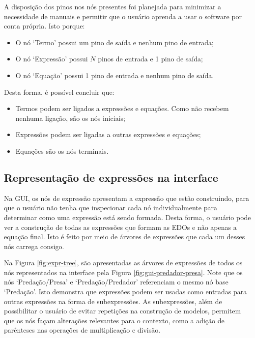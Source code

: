 \documentclass[
	12pt,				%
	openright,			%
	oneside,			%
	a4paper,			%
	main=brazil,
	english,			%
	]{ufsj-abntex2}
\begin{document}
A disposição dos pinos nos nós presentes foi planejada para minimizar a necessidade de manuais e permitir que o usuário aprenda a usar o software por conta própria. Isto porque:

\begin{itemize}
    \item O nó `Termo' possui um pino de saída e nenhum pino de entrada;
    \item O nó `Expressão' possui $N$ pinos de entrada e 1 pino de saída;
    \item O nó `Equação' possui 1 pino de entrada e nenhum pino de saída.
\end{itemize}

Desta forma, é possível concluir que:

\begin{itemize}
    \item Termos podem ser ligados a expressões e equações. Como não recebem nenhuma ligação, são os nós iniciais;
    \item Expressões podem ser ligadas a outras expressões e equações;
    \item Equações são os nós terminais.
\end{itemize}

\subsection{Representação de expressões na interface}
\label{subsec:exprtree}

Na GUI, os nós de expressão apresentam a expressão que estão construindo, para que o usuário não tenha que inspecionar cada nó individualmente para determinar como uma expressão está sendo formada. Desta forma, o usuário pode ver a construção de todas as expressões que formam as EDOs e não apenas a equação final. Isto é feito por meio de árvores de expressões que cada um desses nós carrega consigo.

Na Figura \ref{fig:expr-tree}, são apresentadas as árvores de expressões de todos os nós representados na interface pela Figura \ref{fig:gui-predador-presa}. Note que os nós `Predação/Presa' e `Predação/Predador' referenciam o mesmo nó base `Predação'. Isto demonstra que expressões podem ser usadas como entradas para outras expressões na forma de subexpressões. As subexpressões, além de possibilitar o usuário de evitar repetições na construção de modelos, permitem que os nós façam alterações relevantes para o contexto, como a adição de parênteses nas operações de multiplicação e divisão.
\end{document}
